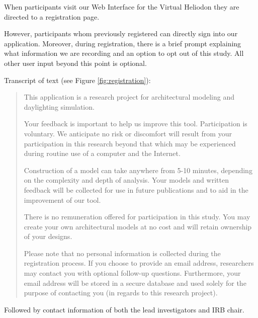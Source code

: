 \documentclass[12pt]{article}
\begin{document}
When participants visit our Web Interface for the Virtual Heliodon
they are directed to a registration page.  

However, participants whom previously registered can directly sign
into our application. Moreover, during registration, there is a brief
prompt explaining what information we are recording and an option to
opt out of this study.  All other user input beyond this point is
optional.



\noindent Transcript of text  (see Figure \ref{fig:registration}):\\

\begin{quote}

This application is a research project for architectural modeling and
daylighting simulation.

Your feedback is important to help us improve this tool.
Participation is voluntary. We anticipate no risk or discomfort will
result from your participation in this research beyond that which may
be experienced during routine use of a computer and the Internet.

Construction of a model can take anywhere from 5-10 minutes, depending
on the complexity and depth of analysis. Your models and written
feedback will be collected for use in future publications and to aid
in the improvement of our tool.

There is no remuneration offered for participation in this study.  You
may create your own architectural models at no cost and will retain
ownership of your designs.

Please note that no personal information is collected during the
registration process.  If you choose to provide an email address,
researchers may contact you with optional follow-up questions.
Furthermore, your email address will be stored in a secure database
and used solely for the purpose of contacting you (in regards to this
research project).\\

\end{quote}

\noindent Followed by contact information of both the lead investigators and IRB chair.
             
\end{document}
